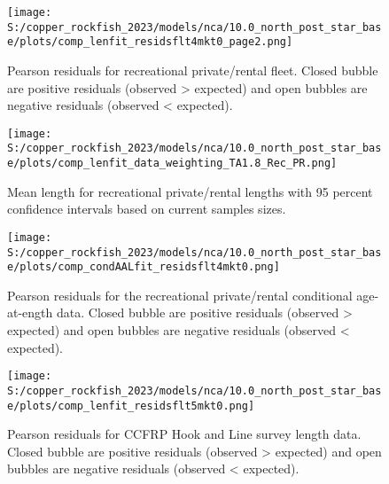 \documentclass[11pt,
  letterpaper,
]{article}
\begin{document}
\pagebreak

\begin{figure}
{\centering
\texttt{[image: S:/copper\_rockfish\_2023/models/nca/10.0\_north\_post\_star\_base/plots/comp\_lenfit\_residsflt4mkt0\_page2.png]}
}
\caption{Pearson residuals for recreational private/rental fleet. Closed bubble are positive residuals (observed > expected) and open bubbles are negative residuals (observed < expected).\label{fig:rec-pr-pearson}}
\end{figure}

\pagebreak

\begin{figure}
{\centering
\texttt{[image: S:/copper\_rockfish\_2023/models/nca/10.0\_north\_post\_star\_base/plots/comp\_lenfit\_data\_weighting\_TA1.8\_Rec\_PR.png]}
}
\caption{Mean length for recreational private/rental lengths with 95 percent confidence intervals based on current samples sizes.\label{fig:rec-pr-mean-len-fit}}
\end{figure}

\pagebreak

\begin{figure}
{\centering
\texttt{[image: S:/copper\_rockfish\_2023/models/nca/10.0\_north\_post\_star\_base/plots/comp\_condAALfit\_residsflt4mkt0.png]}
}
\caption{Pearson residuals for the recreational private/rental conditional age-at-ength data. Closed bubble are positive residuals (observed > expected) and open bubbles are negative residuals (observed < expected).\label{fig:rec-pr-age-pearson}}
\end{figure}

\begin{figure}
{\centering
\texttt{[image: S:/copper\_rockfish\_2023/models/nca/10.0\_north\_post\_star\_base/plots/comp\_lenfit\_residsflt5mkt0.png]}
}
\caption{Pearson residuals for CCFRP Hook and Line survey length data. Closed bubble are positive residuals (observed > expected) and open bubbles are negative residuals (observed < expected).\label{fig:ccfrp-len-pearson}}
\end{figure}

\pagebreak
\end{document}
